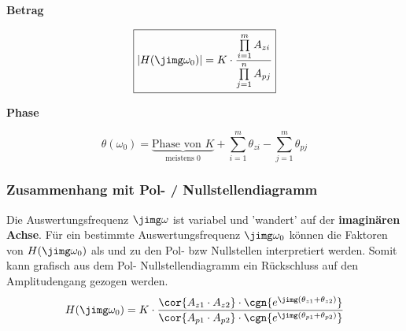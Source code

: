 \vspace{0.2cm}
\begin{minipage}[t]{0.48\columnwidth}
    \begin{center}
        \textbf{Betrag}
    \end{center}
    \vspace{-0.2cm}
    $$ \boxed{ | H(\jimg \omega_0) | = K \cdot \frac{\prod\limits_{i=1}^{m} A_{zi}}{\prod\limits_{j=1}^{n} A_{pj}} } $$
\end{minipage}
\hfill
\begin{minipage}[t]{0.48\columnwidth}
    \begin{center}
        \textbf{Phase}
    \end{center}
    \vspace{-0.2cm}
    $$ \boxed{ \theta(\omega_0) = \underbrace{\text{Phase von } K}_{\text{meistens } 0} + \sum_{i=1}^{m} \theta_{zi} - \sum_{j=1}^{m} \theta_{pj} } $$
\end{minipage}


\subsubsection{Zusammenhang mit Pol- / Nullstellendiagramm}

\begin{minipage}[c]{0.5\columnwidth}
    
\end{minipage}
\hfill
\begin{minipage}[c]{0.48\columnwidth}
    Die Auswertungsfrequenz $\jimg \omega$ ist variabel und 'wandert' auf der \textbf{imaginären Achse}.
    Für ein bestimmte Auswertungsfrequenz $\jimg \omega_0$ können die Faktoren von $H(\jimg \omega_0)$ als 
    und  zu den Pol- bzw Nullstellen interpretiert werden.
    Somit kann grafisch aus dem Pol- Nullstellendiagramm ein Rückschluss auf den Amplitudengang gezogen werden.
    $$ H(\jimg \omega_0) = K \cdot \frac{\cor{A_{z1} \cdot A_{z2}} \cdot \cgn{e^{\jimg(\theta_{z1} + \theta_{z2})}}}
    {\cor{A_{p1} \cdot A_{p2}} \cdot \cgn{e^{\jimg(\theta_{p1} + \theta_{p2})}}}  $$
\end{minipage}



